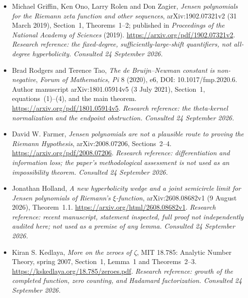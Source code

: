 \documentclass[11pt]{article}
\begin{document}
\begin{itemize}
\item[\textnormal{[E3]}]\hypertarget{extra:statement:3}{} Michael Griffin, Ken Ono,
Larry Rolen and Don Zagier,
\emph{Jensen polynomials for the Riemann zeta function and other sequences},
arXiv:1902.07321v2 (31 March 2019), Section~1, Theorems~1--2;
published in \emph{Proceedings of the National Academy of Sciences} (2019).
\url{https://arxiv.org/pdf/1902.07321v2}.
{\small\textit{Research reference: the fixed-degree, sufficiently-large-shift
quantifiers, not all-degree hyperbolicity. Consulted 24 September 2026.}}

\item[\textnormal{[E4]}]\hypertarget{extra:statement:4}{} Brad Rodgers and Terence Tao,
\emph{The de Bruijn--Newman constant is non-negative},
\emph{Forum of Mathematics, Pi} 8 (2020), e6,
DOI: 10.1017/fmp.2020.6.
Author manuscript arXiv:1801.05914v5 (3 July 2021),
Section~1, equations~(1)--(4), and the main theorem.
\url{https://arxiv.org/pdf/1801.05914v5}.
{\small\textit{Research reference: the theta-kernel normalization and the
endpoint obstruction. Consulted 24 September 2026.}}

\item[\textnormal{[E5]}]\hypertarget{extra:statement:5}{} David W. Farmer,
\emph{Jensen polynomials are not a plausible route to proving the Riemann
Hypothesis}, arXiv:2008.07206, Sections~2--4.
\url{https://arxiv.org/pdf/2008.07206}.
{\small\textit{Research reference: differentiation and information loss;
the paper's methodological assessment is not used as an impossibility theorem.
Consulted 24 September 2026.}}

\item[\textnormal{[E6]}]\hypertarget{extra:statement:6}{} Jonathan Holland,
\emph{A new hyperbolicity wedge and a joint semicircle limit for Jensen
polynomials of Riemann's $\xi$-function},
arXiv:2608.08682v1 (9 August 2026), Theorem~1.1.
\url{https://arxiv.org/html/2608.08682v1}.
{\small\textit{Research reference: recent manuscript, statement inspected,
full proof not independently audited here; not used as a premise of any lemma.
Consulted 24 September 2026.}}

\item[\textnormal{[E7]}]\hypertarget{extra:statement:7}{} Kiran S. Kedlaya,
\emph{More on the zeroes of $\zeta$}, MIT 18.785: Analytic Number Theory,
spring 2007, Section~1, Lemma~1 and Theorems~2--3.
\url{https://kskedlaya.org/18.785/zeroes.pdf}.
{\small\textit{Research reference: growth of the completed function, zero
counting, and Hadamard factorization. Consulted 24 September 2026.}}


\end{itemize}
\end{document}
